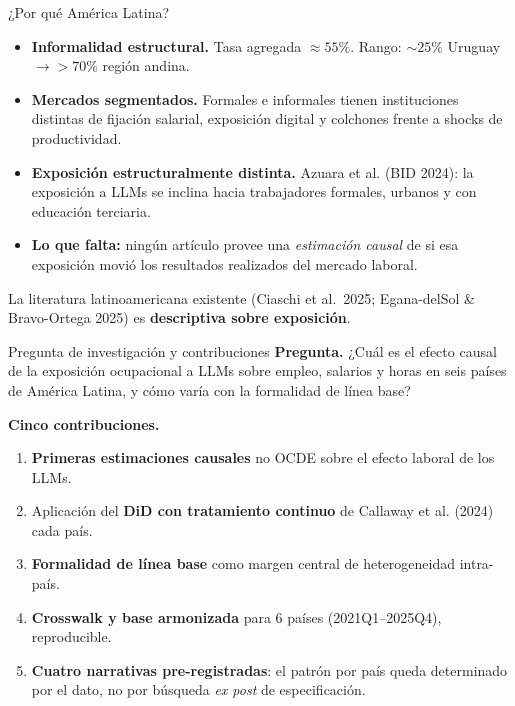 \documentclass[aspectratio=169,11pt]{beamer}
\newcommand{\callout}[2][pblue]{%
  \begin{center}
  \begin{minipage}{0.95\linewidth}
    \setlength{\fboxsep}{0.7em}%
    \colorbox{#1!8}{%
      \begin{minipage}{\dimexpr\linewidth-1.4em}%
        \color{pdark}#2%
      \end{minipage}%
    }%
  \end{minipage}
  \end{center}
}
\newcommand{\cit}[1]{\textcolor{pgray}{\small(#1)}}
\begin{document}
\begin{frame}{¿Por qué América Latina?}
\vspace{0.3em}
\begin{itemize}
  \item \textbf{Informalidad estructural.} Tasa agregada $\approx 55\%$. Rango: $\sim 25\%$ Uruguay $\to >70\%$ región andina.
  \item \textbf{Mercados segmentados.} Formales e informales tienen instituciones distintas de fijación salarial, exposición digital y colchones frente a shocks de productividad.
  \item \textbf{Exposición estructuralmente distinta.} Azuara et al. \cit{BID 2024}: la exposición a LLMs se inclina hacia trabajadores formales, urbanos y con educación terciaria.
  \item \textbf{Lo que falta:} ningún artículo provee una \emph{estimación causal} de si esa exposición movió los resultados realizados del mercado laboral.
\end{itemize}

\vspace{0.4em}
\callout{La literatura latinoamericana existente \cit{Ciaschi et al.\ 2025; Egana-delSol \& Bravo-Ortega 2025} es \textbf{descriptiva sobre exposición}.}
\end{frame}

\begin{frame}{Pregunta de investigación y contribuciones}
\textbf{Pregunta.} ¿Cuál es el efecto causal de la exposición ocupacional a LLMs sobre empleo, salarios y horas en seis países de América Latina, y cómo varía con la formalidad de línea base?

\vspace{0.5em}
\textbf{Cinco contribuciones.}
\begin{enumerate}
  \item \textbf{Primeras estimaciones causales} no OCDE sobre el efecto laboral de los LLMs.
  \item Aplicación del \textbf{DiD con tratamiento continuo} de Callaway et al. \cit{2024} cada país.
  \item \textbf{Formalidad de línea base} como margen central de heterogeneidad intra-país. %
  \item \textbf{Crosswalk y base armonizada} para 6 países (2021Q1--2025Q4), reproducible.
  \item \textbf{Cuatro narrativas pre-registradas}: el patrón por país queda determinado por el dato, no por búsqueda \emph{ex post} de especificación.
\end{enumerate}
\end{frame}
\end{document}
